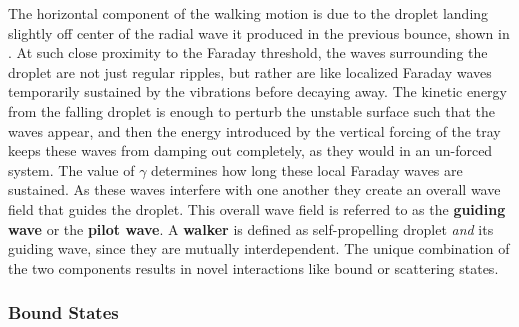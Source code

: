  
The horizontal component of the walking motion is due to the droplet landing slightly off center of the radial wave it produced in the previous bounce, shown in . At such close proximity to the Faraday threshold, the waves surrounding the droplet are not just regular ripples, but rather are like localized Faraday waves temporarily sustained by the vibrations before decaying away. The kinetic energy from the falling droplet is enough to perturb the unstable surface such that the waves appear, and then the energy introduced by the vertical forcing of the tray keeps these waves from damping out completely, as they would in an un-forced system. The value of $\gamma$ determines how long these local Faraday waves are sustained. As these waves interfere with one another they create an overall wave field that guides the droplet. This overall wave field is referred to as the \textbf{guiding wave} or the \textbf{pilot wave}. A \textbf{walker} is defined as self-propelling droplet \textit{and} its guiding wave, since they are mutually interdependent. The unique combination of the two components results in novel interactions like bound or scattering states.



 \subsubsection{Bound States}

